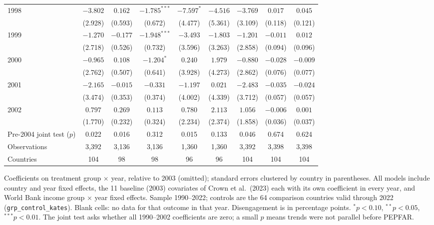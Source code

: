 \begin{table}[htbp]
{\begin{tabular}{lcccccccc}
1998 & $-3.802$ & $0.162$ & $-1.785^{***}$ & $-7.597^{*}$ & $-4.516$ & $-3.769$ & $0.017$ & $0.045$ \\
 & (2.928) & (0.593) & (0.672) & (4.477) & (5.361) & (3.109) & (0.118) & (0.121) \\
1999 & $-1.270$ & $-0.177$ & $-1.948^{***}$ & $-3.493$ & $-1.803$ & $-1.201$ & $-0.011$ & $0.012$ \\
 & (2.718) & (0.526) & (0.732) & (3.596) & (3.263) & (2.858) & (0.094) & (0.096) \\
2000 & $-0.965$ & $0.108$ & $-1.204^{*}$ & $0.240$ & $1.979$ & $-0.880$ & $-0.028$ & $-0.009$ \\
 & (2.762) & (0.507) & (0.641) & (3.928) & (4.273) & (2.862) & (0.076) & (0.077) \\
2001 & $-2.165$ & $-0.015$ & $-0.331$ & $-1.197$ & $0.021$ & $-2.483$ & $-0.035$ & $-0.024$ \\
 & (3.474) & (0.353) & (0.374) & (4.002) & (4.339) & (3.712) & (0.057) & (0.057) \\
2002 & $0.797$ & $0.269$ & $0.113$ & $0.780$ & $2.113$ & $1.056$ & $-0.006$ & $0.001$ \\
 & (1.770) & (0.232) & (0.324) & (2.234) & (2.374) & (1.858) & (0.036) & (0.037) \\
\midrule
Pre-2004 joint test ($p$) & 0.022 & 0.016 & 0.312 & 0.015 & 0.133 & 0.046 & 0.674 & 0.624 \\
Observations & 3,392 & 3,136 & 3,136 & 1,360 & 1,360 & 3,392 & 3,398 & 3,398 \\
Countries & 104 & 98 & 98 & 96 & 96 & 104 & 104 & 104 \\
\bottomrule
\end{tabular}}
\par\vspace{4pt}
\begin{minipage}{\textwidth}\footnotesize Coefficients on treatment group $\times$ year, relative to 2003 (omitted); standard errors clustered by country in parentheses. All models include country and year fixed effects, the 11 baseline (2003) covariates of Crown et al.\ (2023) each with its own coefficient in every year, and World Bank income group $\times$ year fixed effects. Sample 1990--2022; controls are the 64 comparison countries valid through 2022 (\texttt{grp\_control\_kates}). Blank cells: no data for that outcome in that year. Disengagement is in percentage points. $^{*}p<0.10$, $^{**}p<0.05$, $^{***}p<0.01$. The joint test asks whether all 1990--2002 coefficients are zero; a small $p$ means trends were not parallel before PEPFAR.\end{minipage}
\end{table}

